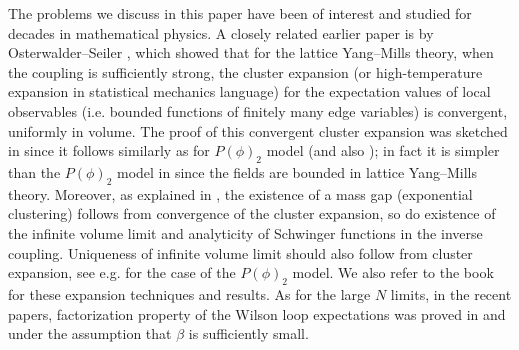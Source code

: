 \documentclass[11pt,UTF-8,reqno]{amsart}
\numberwithin{equation}{section}
\begin{document}
The problems we discuss in this paper have been of interest and studied for decades in mathematical physics. 
A closely related
 earlier paper is by Osterwalder--Seiler \cite{OS1978},
which showed that for the lattice Yang--Mills theory, when the coupling is sufficiently strong,
the cluster expansion (or high-temperature expansion in statistical mechanics language)
for the expectation values of local observables (i.e. bounded functions of finitely many edge variables)
is convergent, uniformly in volume.
The proof of this convergent cluster expansion was sketched in \cite{OS1978} since it follows similarly as
\cite{GJS1973} for $P(\phi)_2$ model (and also \cite{MR389080}); in fact it is  simpler than the $P(\phi)_2$ model in \cite{GJS1973} since the fields are bounded in lattice Yang--Mills theory.
Moreover, as explained in \cite{OS1978},  the existence of a mass gap (exponential clustering) follows from  convergence of the cluster expansion, so do existence of the infinite volume limit and analyticity of  Schwinger functions  in the inverse coupling.
Uniqueness of infinite volume limit should also follow from cluster expansion, see e.g. \cite{MR990999} for the case of the $P(\phi)_2$ model.
We also refer to the book \cite{MR785937} for these expansion techniques and results. 
As for the large $N$ limits,
in the recent papers, factorization property of the Wilson loop expectations was proved in \cite[Corollary 3.2]{Cha} and \cite{Jafar} under the assumption that $\beta$ is sufficiently small.
\end{document}
